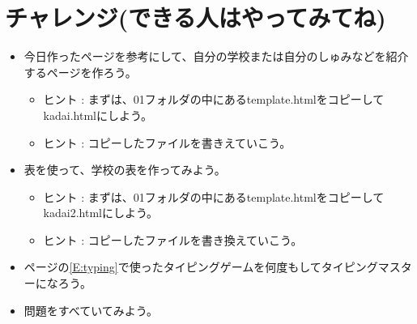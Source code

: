 \documentclass[a4paper,12pt]{jarticle}
\begin{document}
\section{チャレンジ(できる人はやってみてね)}
\begin{itemize}
      \item
            今日作ったページを参考にして、自分の学校または自分のしゅみなどを紹介するページを作ろう。

            \begin{itemize}
                  \item ヒント :
                        まずは、01フォルダの中にあるtemplate.htmlをコピーしてkadai.htmlにしよう。
                  \item ヒント :
                        コピーしたファイルを書きえていこう。
            \end{itemize}
      \item
            表を使って、学校の表を作ってみよう。

            \begin{itemize}
                  \item ヒント :
                        まずは、01フォルダの中にあるtemplate.htmlをコピーしてkadai2.htmlにしよう。
                  \item ヒント :
                        コピーしたファイルを書き換えていこう。
            \end{itemize}
      \item
            \pageref*{E:typing}ページの\ref*{E:typing}で使ったタイピングゲームを何度もしてタイピングマスターになろう。
      \item 問題をすべていてみよう。
\end{itemize}

\bigskip


\bigskip


\bigskip

\clearpage
\end{document}
